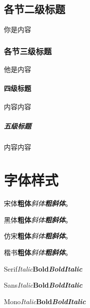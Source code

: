 \subsection{各节二级标题}
你是内容

\subsubsection{各节三级标题}
他是内容

\paragraph{四级标题}
内容内容

\subparagraph{五级标题}
内容内容

\section{字体样式}
宋体\quad \textbf{粗体}\quad \textit{斜体}\quad \textbf{\textit{粗斜体}}。

{\heiti 黑体\quad \textbf{粗体}\quad \textit{斜体}\quad \textbf{\textit{粗斜体}}}。

{\fangsong 仿宋\quad \textbf{粗体}\quad \textit{斜体}\quad \textbf{\textit{粗斜体}}}。

{\kaishu 楷书\quad \textbf{粗体}\quad \textit{斜体}\quad \textbf{\textit{粗斜体}}}。

Serif\quad \textit{Italic}\quad \textbf{Bold}\quad \textbf{\textit{BoldItalic}}

{\sffamily Sans\quad \textit{Italic}\quad \textbf{Bold}\quad \textbf{\textit{BoldItalic}}}

{\ttfamily Mono\quad \textit{Italic}\quad \textbf{Bold}\quad \textbf{\textit{BoldItalic}}}
